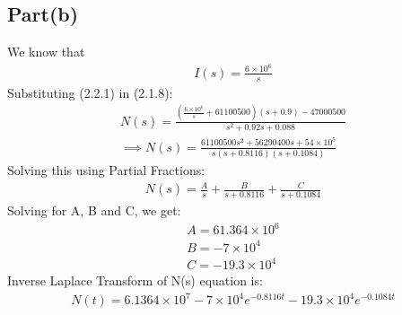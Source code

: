 \documentclass[journal,12pt,twocolumn]{IEEEtran}
\begin{document}
\subsection{Part(b)}
We know that
\begin{align}
    I(s) = \frac{6 \times 10^6}{s}
\end{align}
Substituting (2.2.1) in (2.1.8):
\begin{align}
    N(s) = \frac{( \frac{6 \times 10^6}{s}+61100500)(s + 0.9) - 47000500}{s^2 + 0.92s + 0.088}
\\\implies N(s) = \frac{61100500s^2 + 56290400s + 54\times10^5 }{s(s + 0.8116)(s + 0.1084)}
\end{align}
Solving this using Partial Fractions:
\begin{align}
    N(s) = \frac{A}{s} + \frac{B}{s+0.8116} + \frac{C}{s+0.1084}
\end{align}
Solving for A, B and C, we get:
\begin{align}
    A = 61.364 \times 10^6
   \\B = -7\times10^4
\\C = -19.3\times10^4
\end{align}
Inverse Laplace Transform of N(s) equation is:
\begin{align}
    N(t) = 6.1364 \times 10^7 -7\times10^4 e^{-0.8116t} -19.3\times10^4 e^{-0.1084t}
\end{align}
\end{document}
